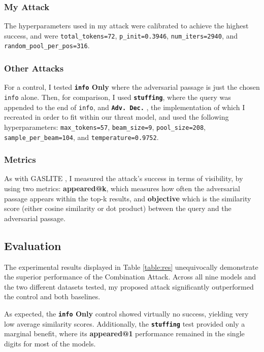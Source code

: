\documentclass[a4paper, sigconf]{acmart}
\begin{document}
\subsubsection*{My Attack} The hyperparameters used in my attack were calibrated to achieve the highest success, and were  \texttt{total\_tokens=72}, \texttt{p\_init=0.3946}, \texttt{num\_iters=2940}, and \texttt{random\_pool\_per\_pos=316}.

\subsubsection*{Other Attacks} For a control, I tested \textbf{\texttt{info} Only} where the adversarial passage is just the chosen \texttt{info} alone. Then, for comparison, I used \textbf{\texttt{stuffing}}, where the query was appended to the end of \texttt{info}, and \textbf{\texttt{Adv. Dec.}} \cite{zhang2025-adv}, the implementation of which I recreated in order to fit within our threat model, and used the following hyperparameters: \texttt{max\_tokens=57}, \texttt{beam\_size=9}, \texttt{pool\_size=208}, \\\texttt{sample\_per\_beam=104}, and \texttt{temperature=0.9752}.

\subsubsection*{Metrics} As with GASLITE \cite{bentov2024}, I measured the attack's success in terms of visibility, by using two metrics: \textbf{appeared@k}, which measures how often the adversarial passage appears within the top-k results, and \textbf{objective} which is the similarity score (either cosine similarity or dot product) between the query and the adversarial passage. 


\subsection{Evaluation}

The experimental results displayed in Table \ref{table:res} unequivocally demonstrate the superior performance of the Combination Attack. Across all nine models and the two different datasets tested, my proposed attack significantly outperformed the control and both baselines.

As expected, the \textbf{\texttt{info} Only} control showed virtually no success, yielding very low average similarity scores. Additionally, the \textbf{\texttt{stuffing}} test provided only a marginal benefit, where its \textbf{appeared@1} performance remained in the single digits for most of the models.
\end{document}
